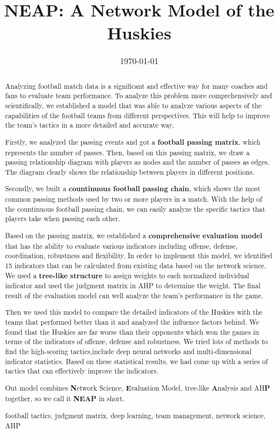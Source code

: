 \documentclass{mcmthesis}
\begin{document}
\linespread{0.6} %
\setlength{\parskip}{0.5\baselineskip} %
\title{NEAP: A Network Model of the Huskies}

\date{\today}
\begin{abstract}
\par Analyzing football match data is a significant and effective way for many coaches and fans to evaluate team performance. To analyze this problem more comprehensively and scientifically, we established a model that was able to analyze various aspects of the capabilities of the football teams from different perspectives. This will help to improve the team's tactics in a more detailed and accurate way.\par

Firstly, we analyzed the passing events and got a \textbf{football passing matrix}, which represents the number of passes. Then, based on this passing matrix, we draw a passing relationship diagram with players as nodes and the number of passes as edges. The diagram clearly shows the relationship between players in different positions.\par

Secondly, we built a \textbf{countinuous football passing chain}, which shows the most common passing methods used by two or more players in a match. With the help of the countinuous football passing chain, we can easily analyze the specific tactics that players take when passing each other.\par

Based on the passing matrix, we established a \textbf{comprehensive evaluation model} that has the ability to evaluate various indicators including offense, defense, coordination, robustness and flexibility. In order to implement this model, we identified 15 indicators that can be calculated from existing data based on the network science. We used a \textbf{tree-like structure} to assign weights to each normalized individual indicator and used the judgment matrix in AHP to determine the weight. The final result of the evaluation model can well analyze the team's performance in the game.\par

Then we used this model to compare the detailed indicators of the Huskies with the teams that performed better than it and analyzed the influence factors behind. We found that the Huskies are far worse than their opponents which won the games in terms of the indicators of offense, defense and robustness. We tried lots of methods to find the high-scoring tactics,include deep neural networks and multi-dimensional indicator statistics. Based on these statistical results, we had come up with a series of tactics that can effectively improve the indicators.

Out model combines \textbf{N}etwork Science, \textbf{E}valuation Model, tree-like \textbf{A}nalysis and AH\textbf{P} together, so we call it \textbf{NEAP} in short.

	\begin{keywords}
		football tactics, judgment matrix, deep learning, team management, network science, AHP
	\end{keywords}
\end{abstract}
\end{document}
